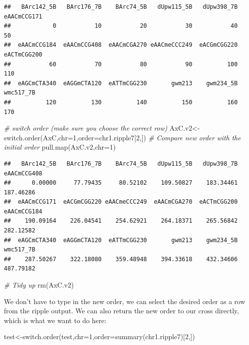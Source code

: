 \documentclass[
]{book}
\newenvironment{Shaded}{\begin{snugshade}}{\end{snugshade}}
\newcommand{\AttributeTok}[1]{\textcolor[rgb]{0.77,0.63,0.00}{#1}}
\newcommand{\CommentTok}[1]{\textcolor[rgb]{0.56,0.35,0.01}{\textit{#1}}}
\newcommand{\DecValTok}[1]{\textcolor[rgb]{0.00,0.00,0.81}{#1}}
\newcommand{\FunctionTok}[1]{\textcolor[rgb]{0.00,0.00,0.00}{#1}}
\newcommand{\NormalTok}[1]{#1}
\newcommand{\OtherTok}[1]{\textcolor[rgb]{0.56,0.35,0.01}{#1}}
\begin{document}
\begin{verbatim}
##   BArc142_5B   BArc176_7B    BArc74_5B   dUpw115_5B   dUpw398_7B  eAACmCCG171 
##            0           10           20           30           40           50 
##  eAACmCCG184  eAACmCCG408  eAACmCGA270 eAACmeCCC249  eACGmCGG220  eACTmCGG200 
##           60           70           80           90          100          110 
##  eAGCmCTA340  eAGGmCTA120  eATTmCGG230       gwm213    gwm234_5B    wmc517_7B 
##          120          130          140          150          160          170
\end{verbatim}

\begin{Shaded}
\begin{Highlighting}[]
\CommentTok{\# switch order (make sure you choose the correct row)}
\NormalTok{AxC.v2}\OtherTok{\textless{}{-}}\FunctionTok{switch.order}\NormalTok{(AxC,}\AttributeTok{chr=}\DecValTok{1}\NormalTok{,}\AttributeTok{order=}\NormalTok{chr1.ripple7[}\DecValTok{2}\NormalTok{,])}
\CommentTok{\#  Compare new order with the initial order}
\FunctionTok{pull.map}\NormalTok{(AxC.v2,}\AttributeTok{chr=}\DecValTok{1}\NormalTok{) }
\end{Highlighting}
\end{Shaded}

\begin{verbatim}
##   BArc142_5B   BArc176_7B    BArc74_5B   dUpw115_5B   dUpw398_7B  eAACmCCG408 
##      0.00000     77.79435     80.52102    109.50827    183.34461    187.46286 
##  eAACmCCG171  eACGmCGG220 eAACmeCCC249  eAACmCGA270  eACTmCGG200  eAACmCCG184 
##    190.09164    226.04541    254.62921    264.18371    265.56842    282.12582 
##  eAGCmCTA340  eAGGmCTA120  eATTmCGG230       gwm213    gwm234_5B    wmc517_7B 
##    287.50267    322.18080    359.48948    394.33618    432.34606    487.79182
\end{verbatim}

\begin{Shaded}
\begin{Highlighting}[]
\CommentTok{\#  Tidy up}
\FunctionTok{rm}\NormalTok{(AxC.v2)}
\end{Highlighting}
\end{Shaded}

We don't have to type in the new order, we can select the desired order as a row from the ripple output. We can also return the new order to our cross directly, which is what we want to do here:

\begin{Shaded}
\begin{Highlighting}[]
\NormalTok{test}\OtherTok{\textless{}{-}}\FunctionTok{switch.order}\NormalTok{(test,}\AttributeTok{chr=}\DecValTok{1}\NormalTok{,}\AttributeTok{order=}\FunctionTok{summary}\NormalTok{(chr1.ripple7)[}\DecValTok{2}\NormalTok{,]) }
\end{Highlighting}
\end{Shaded}
\end{document}

